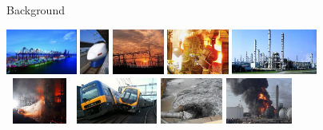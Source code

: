 \begin{frame}{Background}
    \begin{center}
      \begin{minipage}[m]{0.9\textwidth}
        \includegraphics[height=1.5cm]{Figures/Introduction/Fig1.png} \hfill
        \includegraphics[height=1.5cm]{Figures/Introduction/Fig2.png} \hfill
        \includegraphics[height=1.5cm]{Figures/Introduction/Fig3.png} \hfill
        \includegraphics[height=1.5cm]{Figures/Introduction/Fig4.png} \hfill
        \includegraphics[height=1.5cm]{Figures/Introduction/Fig5.png} \vspace{1pt}\\
        \includegraphics[height=1.5cm, width = 2.2cm]{Figures/Introduction/Fig6.png} \hfill
        \includegraphics[height=1.5cm]{Figures/Introduction/Fig7.png} \hfill
        \includegraphics[height=1.5cm]{Figures/Introduction/Fig8.png} \hfill
        \includegraphics[height=1.5cm]{Figures/Introduction/Fig9.png}
      \end{minipage}
    \end{center}
\end{frame}

